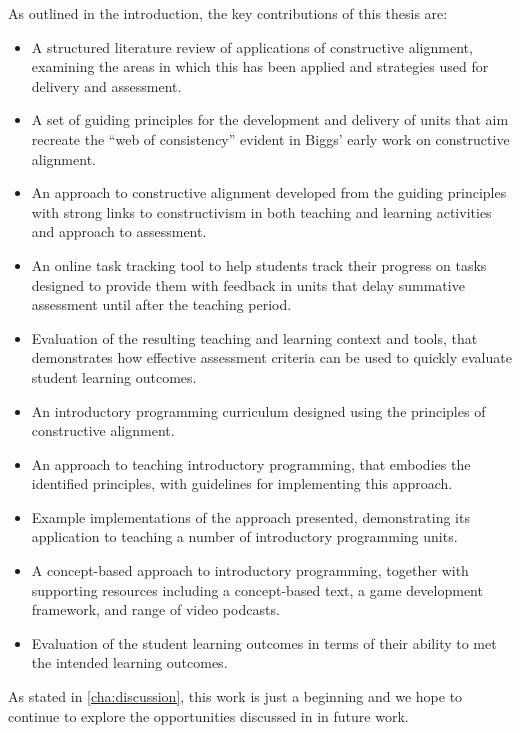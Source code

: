 As outlined in the introduction, the key contributions of this thesis are:
\begin{itemize}[noitemsep,nolistsep]
	\item A structured literature review of applications of constructive alignment, examining the areas in which this has been applied and strategies used for delivery and assessment.
	\item A set of guiding principles for the development and delivery of units that aim recreate the ``web of consistency'' evident in Biggs' early work on constructive alignment. 
	\item An approach to constructive alignment developed from the guiding principles with strong links to constructivism in both teaching and learning activities and approach to assessment.
	\item An online task tracking tool to help students track their progress on tasks designed to provide them with feedback in units that delay summative assessment until after the teaching period.
	\item Evaluation of the resulting teaching and learning context and tools, that demonstrates how effective assessment criteria can be used to quickly evaluate student learning outcomes.
	\item An introductory programming curriculum designed using the principles of constructive alignment.
	\item An approach to teaching introductory programming, that embodies the identified principles, with guidelines for implementing this approach.
	\item Example implementations of the approach presented, demonstrating its application to teaching a number of introductory programming units.
	\item A concept-based approach to introductory programming, together with supporting resources including a concept-based text, a game development framework, and range of video podcasts.
	\item Evaluation of the student learning outcomes in terms of their ability to met the intended learning outcomes.
\end{itemize}

As stated in \cref{cha:discussion}, this work is just a beginning and we hope to continue to explore the opportunities discussed in  in future work.

